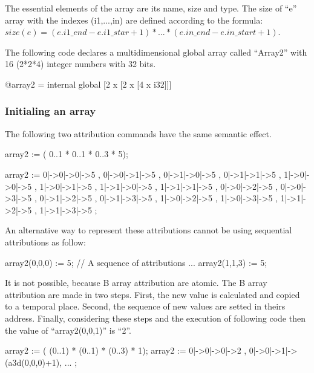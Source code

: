 The essential elements of the array are its name, size and type. 
The size of ``e'' array with the indexes (i1,...,in) are defined according 
to the formula:\\
 $size(e) = (e.i1\_end - e.i1\_star+1) * ... * (e.in\_end - e.in\_start+1)$.


The following code declares a multidimensional global array called ``Array2'' 
with 16 (2*2*4) integer numbers with 32 bits.

\begin{llvmcode}
@array2 = internal global [2 x [2 x [4 x i32]]]
\end{llvmcode}

\subsubsection{Initialing an array}
The following two attribution commands have the same semantic effect.
 
\begin{pascalcode}
array2 := ( 0..1 * 0..1 * 0..3 * {5});

array2 := { 0|->0|->0|->5 , 0|->0|->1|->5 , 
            0|->1|->0|->5 , 0|->1|->1|->5 , 
            1|->0|->0|->5 , 1|->0|->1|->5 , 
            1|->1|->0|->5 , 1|->1|->1|->5 ,
            0|->0|->2|->5 , 0|->0|->3|->5 ,
            0|->1|->2|->5 , 0|->1|->3|->5 , 
            1|->0|->2|->5 , 1|->0|->3|->5 , 
            1|->1|->2|->5 , 1|->1|->3|->5 };
\end{pascalcode}

An alternative way to represent these attributions cannot be using sequential attributions as follow:

\begin{pascalcode}
array2(0,0,0) := 5;
// A sequence of attributions ...
array2(1,1,3) := 5;
\end{pascalcode}

It is not possible, because B array attribution are atomic. The B array 
attribution are made in two steps. First, the new value is calculated and
copied to a temporal place. Second, the sequence of new values are setted 
in theirs address. Finally, considering these steps and the execution of
following code then the value of ``array2(0,0,1)'' is ``2''.

\begin{pascalcode}
 array2 := ( (0..1) * (0..1) * (0..3) * {1});
 array2 := { 0|->0|->0|->2 , 0|->0|->1|->(a3d(0,0,0)+1), ...  };
\end{pascalcode}

